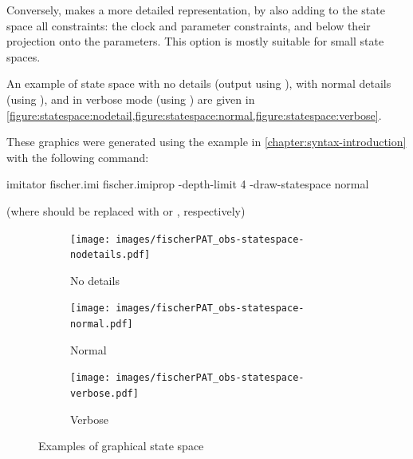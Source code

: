 Conversely,  makes a more detailed representation, by also adding to the state space all constraints:
the clock and parameter constraints, and below their projection onto the parameters.
This option is mostly suitable for small state spaces.

\begin{example}
	An example of state space with no details (output using ), with normal details (using ), and in verbose mode (using ) are given in \cref{figure:statespace:nodetail,figure:statespace:normal,figure:statespace:verbose}.

	These graphics were generated using the example in \cref{chapter:syntax-introduction} with the following command:

\begin{terminal}
imitator fischer.imi fischer.imiprop -depth-limit 4 -draw-statespace normal
\end{terminal}

	(where  should be replaced with  or , respectively)
\end{example}

\begin{figure}
	\centering
	\begin{subfigure}[b]{.48\textwidth}
		\texttt{[image: images/fischerPAT\_obs-statespace-nodetails.pdf]}

		\caption{No details}
		\label{figure:statespace:nodetail}
	\end{subfigure}
	\begin{subfigure}[b]{.48\textwidth}
		\texttt{[image: images/fischerPAT\_obs-statespace-normal.pdf]}

		\caption{Normal}
		\label{figure:statespace:normal}
	\end{subfigure}

	\begin{subfigure}[b]{.75\textwidth}
		\texttt{[image: images/fischerPAT\_obs-statespace-verbose.pdf]}

		\caption{Verbose}
		\label{figure:statespace:verbose}
	\end{subfigure}

	\caption{Examples of graphical state space}
\end{figure}




